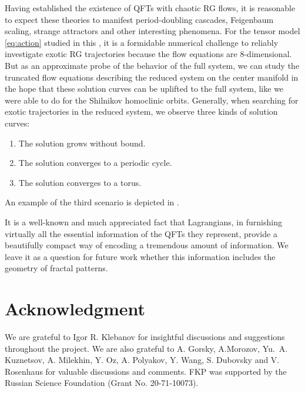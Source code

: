 Having established the existence of QFTs with chaotic RG flows, it is reasonable to expect these theories to manifest period-doubling cascades, Feigenbaum scaling, strange attractors and other interesting phenomena. For the tensor model \cref{eq:action} studied in this \paper{}, it is a formidable numerical challenge to reliably investigate exotic RG trajectories because the flow equations are 8-dimensional. But as an approximate probe of the behavior of the full system, we can study the truncated flow equations describing the reduced system on the center manifold in the hope that these solution curves can be uplifted to the full system, like we were able to do for the Shilnikov homoclinic orbits. Generally, when searching for exotic trajectories in the reduced system, we observe three kinds of solution curves:
\begin{enumerate}
\item The solution grows without bound.
\item The solution converges to a periodic cycle.
\item The solution converges to a torus.
\end{enumerate}
An example of the third scenario is depicted in .

It is a well-known and much appreciated fact that Lagrangians, in furnishing virtually all the essential information of the QFTs they represent, provide a beautifully compact way of encoding a tremendous amount of information. We leave it as a question for future work whether this information includes the geometry of fractal patterns.



\section*{Acknowledgment}

We are grateful to Igor R. Klebanov for insightful discussions and suggestions throughout the project. We are also grateful to A. Gorsky, A.Morozov, Yu.\ A. Kuznetsov, A. Milekhin, Y. Oz,  A. Polyakov, Y. Wang, S. Dubovsky and V. Rosenhaus for valuable discussions and comments. 
FKP was supported by the Russian Science Foundation (Grant No. 20-71-10073).

